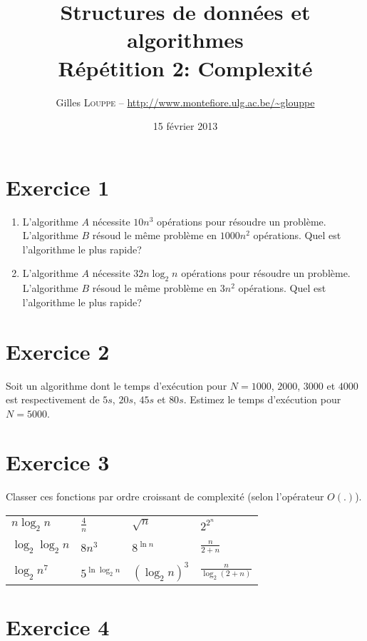 \documentclass[a4paper,10pt]{article}
\title{
    \textbf{Structures de données et algorithmes}\\
    Répétition 2: Complexité
}
\author{Gilles \textsc{Louppe} -- \url{http://www.montefiore.ulg.ac.be/~glouppe}}
\date{15 février 2013}
\begin{document}
\maketitle

\section*{Exercice 1}

\begin{enumerate}

\item L'algorithme $A$ nécessite $10n^3$ opérations pour résoudre un problème.
L'algorithme $B$ résoud le même problème en $1000n^2$ opérations. Quel est
l'algorithme le plus rapide?

\item L'algorithme $A$ nécessite $32n \log_2 n$ opérations pour résoudre un
problème.  L'algorithme $B$ résoud le même problème en $3n^2$ opérations. Quel
est l'algorithme le plus rapide?

\end{enumerate}

\section*{Exercice 2}

Soit un algorithme dont le temps d'exécution pour $N=1000$, $2000$, $3000$ et
$4000$ est respectivement de $5s$, $20s$, $45s$ et $80s$. Estimez le temps
d'exécution pour $N=5000$.

\section*{Exercice 3}

Classer ces fonctions par ordre croissant de complexité (selon l'opérateur
$O(.)$).

\begin{center}
\begin{tabular}{llll}
    $n \log_2 n$ & $\frac{4}{n}$ & $\sqrt{n}$ & $2^{2^n}$ \\\\
    $\log_2 \log_2 n$ & $8n^3$ & $8^{\ln n}$ & $\frac{n}{2+n}$ \\\\
    $\log_2 n^7$ & $5^{\ln \log_2 n}$ & $(\log_2 n)^3$ & $\frac{n}{\log_2 (2+n)}$
\end{tabular}
\end{center}

\section*{Exercice 4}
\end{document}
